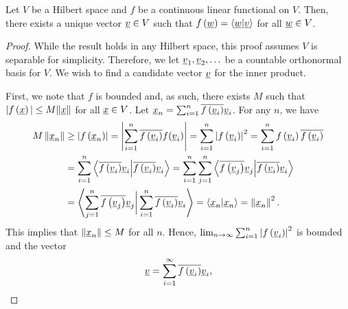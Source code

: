 \begin{theorem}[Riesz] \label{theorem:FunctionalInnerProduct}
Let $V$ be a Hilbert space and $f$ be a continuous linear functional on $V$.
Then, there exists a unique vector $\underline{v} \in V$ such that $f \left( \underline{w} \right) = \left\langle \underline{w} | \underline{v} \right\rangle$ for all $\underline{w} \in V$.
\end{theorem}
\begin{proof}
While the result holds in any Hilbert space, this proof assumes $V$ is separable for simplicity.
Therefore, we let $\underline{v}_1, \underline{v}_2, \ldots$ be a countable orthonormal basis for $V$.
We wish to find a candidate vector $\underline{v}$ for the inner product.

First, we note that $f$ is bounded and, as such, there exists $M$ such that $| f \left( \underline{x} \right) | \leq M \| \underline{x} \|$ for all $\underline{x} \in V$.
Let $\underline{x}_n = \sum_{i=1}^n \overline{ f \left( \underline{v}_i \right) } \underline{v}_i$.
For any $n$, we have
\begin{equation*}
\begin{split}
M \left\| \underline{x}_n \right\| &\geq \left| f \left( \underline{x}_n \right) \right|
= \left| \sum_{i=1}^n \overline{ f \left( \underline{v}_i \right) } f(\underline{v}_i) \right|
= \sum_{i=1}^n \left| f \left( \underline{v}_i \right) \right|^2
= \sum_{i=1}^n f \left( \underline{v}_i \right)
\overline{ f \left( \underline{v}_i \right) } \\
&= \sum_{i=1}^n \left\langle \overline{ f \left( \underline{v}_i \right) } \underline{v}_i
\Big| \overline{ f \left( \underline{v}_i \right) } \underline{v}_i \right\rangle
= \sum_{i=1}^n \sum_{j=1}^n
\left\langle \overline{ f \left( \underline{v}_j \right) } \underline{v}_j
\Big| \overline{ f \left( \underline{v}_i \right) } \underline{v}_i \right\rangle \\
&= \left\langle \sum_{j=1}^n
\overline{ f \left( \underline{v}_j \right) } \underline{v}_j
\bigg| \sum_{i=1}^n
\overline{ f \left( \underline{v}_i \right) } \underline{v}_i \right\rangle
= \left\langle \underline{x}_n | \underline{x}_n \right\rangle
= \left\| \underline{x}_n \right\|^2 .
\end{split}
\end{equation*}
This implies that $\| \underline{x}_n \| \leq M$ for all $n$.
Hence, $\lim_{n \rightarrow \infty} \sum_{i=1}^n \left| f \left( \underline{v}_i \right) \right|^2$ is bounded and the vector
\begin{equation*}
\vecnot{v} = \sum_{i=1}^{\infty} \overline{ f \left( \vecnot{v}_i \right) } \vecnot{v}_i ,

\end{equation*}
\end{proof}
